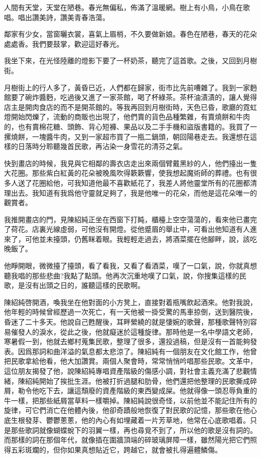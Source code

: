 \documentclass[a6paper]{article}
\begin{document}
人間有天堂，天堂在陋巷。春光無偏私，佈滿了溫暖網。樹上有小鳥，小鳥在歌唱。唱出讚美詩，讚美青春浩蕩。

鄰家有少女，當窗曬衣裳，喜氣上眉梢，不久要做新娘。春色在陋巷，春天的花朵處處香。我們要鼓掌，歡迎這好春光。

我坐下來，在光怪陸離的燈影下要了一杯奶茶，聽完了這首歌。之後，又回到月樹街。

月樹街上的行人多了，黃昏已近，人們都在歸家，街市比先前嘈雜了。我到一家麪館要了碗炸醬麪，吃過後又進了一家茶館，喝了杯綠茶。茶杯油漬漬的，讓人覺得店主是開肉食店的而不是開茶館的。等我再回到月樹街時，天色已昏，歌廳的霓虹燈開始閃爍了，流動的商販也出現了，他們賣的貨色品種繁雜，有賣燒餅和牛肉的，也有賣棉花糖、頭飾、背心短褲、果品以及二手手機和盜版書籍的。我買了一摞燒餅，一塊醬牛肉，又到一家超市買了一瓶二鍋頭，朝回陽巷走去。我還想在這樣的日落時分聆聽幾首民歌，再沾染一身雪花的清芬之氣。

快到畫店的時候，我見與它相鄰的壽衣店走出來兩個臂戴黑紗的人，他們擡出一隻大花圈。那些紫白紅黃的花朵被晚風吹得簌簌響，使我想起魔術師的葬禮。也有很多人送了花圈給他，可我知道他最不喜歡紙花了，我差人將他靈堂所有的花圈都清理出去。我知道有我爲他守靈就足夠了，我是他唯一的花朵，而他是這花朵唯一的觀賞者。

我推開畫店的門，見陳紹純正坐在西窗下打盹，櫃檯上空空蕩蕩的，看來他已畫完了荷花。店裏光線虛弱，可他沒有開燈。從他蹙眉的舉止中，可看出他知道有人進來了，可他並未擡頭，仍舊眯着眼。我輕輕走過去，將酒菜擺在他腳畔，說，該吃晚飯了。

他睜開眼，微微擡了擡頭，看了看我，又看了看酒菜，嘆了一口氣，說，你就真想聽我唱的那些悲曲?我點了點頭。他再次沉重地嘆了口氣，說，你搜集這樣的民歌，是沒有出頭之日的，誰聽這樣的民歌啊。

陳紹純啓開酒，喚我坐在他對面的小方凳上，直接對着瓶嘴飲起酒來。他對我說，他年輕的時候曾經歷過一次死亡，有一天他被一掛受驚的馬車掠倒，送到醫院後，昏迷了二十多天。他說自己甦醒後，耳畔縈繞的就是悽婉的歌聲，那種歌聲特別容易催發人的淚水，從此之後，他就癡迷於這種旋律。那時他是一名中學語文老師，寒暑假一到，他就去鄉村蒐集民歌，整理了很多，還投過稿，但是沒有一首能夠發表。因爲那詞和曲洋溢的氣息都太悲涼了。陳紹純有一個朋友在文化館工作，他曾把民歌拿給他看，他大加讚賞。兩個人聚會時，常常悄悄吟唱那些民歌。文革中，這位朋友揭發了他，說陳紹純專唱資產階級的傷感小調，對社會主義充滿了悲觀情緒，陳紹純開始了挨批生涯。他被打折過腿和肋骨，他們還把他整理的民歌撕成碎屑，勒令他吃下去，讓這頹廢的資產階級的東西變成屎。他就得像一頭忍辱負重的牛一樣，把那些紙屑當草料一樣嚼掉。陳紹純說很奇怪，以前他並不能記住所有的旋律，可它們消亡在他體內後，他卻奇蹟般地恢復了對民歌的記憶，那些歌在他心底生根發芽、鬱鬱蔥蔥，他的內心有如埋藏着一片芳草地，他常在心底歌唱着。只是那些歌詞就像蝴蝶蛻下的羽翼一樣，再也尋覓不到了，所以他的歌是沒有詞的。而那樣的詞在那個年代，就像插在圍牆頂端的碎玻璃屏障一樣，雖然陽光把它們照得五彩斑斕的，但你如果真想貼近它，跨越它，就會被扎得遍體鱗傷。
\end{document}
